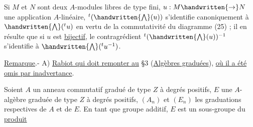 Si $M$ et $N$ sont deux $A$-modules libres de type fini, $u:M\handwritten{\to}N$ une application $A$-linéaire, ${}^{t}(\handwritten{\bigwedge}(u))$ s'identifie canoniquement à $\handwritten{\bigwedge}({}^{t}u)$ en vertu de la commutativité du diagramme (25) ; il en résulte que si $u$ est \uline{bijectif}, le contragrédient ${}^{t}(\handwritten{\bigwedge}(u))^{-1}$ s'identifie à $\handwritten{\bigwedge}({}^{t}u^{-1})$.

\uline{Remarque}.- A) \uline{Rabiot qui doit remonter au} \S3 (\uline{Algèbres graduées}), \uline{où il a été omis par inadvertance}.

Soient $A$ un anneau commutatif gradué de type $Z$ à degrés positifs, $E$ une $A$-algèbre graduée de type $Z$ à degrés positifs, $(A_n)$ et $(E_n)$ les graduations respectives de $A$ et de $E$. En tant que groupe additif, $E$ est un sous-groupe du \uline{produit}
